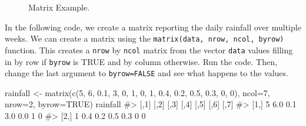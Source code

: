 \documentclass[
  letterpaper,
]{latex/krantz}
\makeatletter
\newenvironment{Shaded}{\begin{snugshade}}{\end{snugshade}}
\newcommand{\AttributeTok}[1]{\textcolor[rgb]{0.40,0.45,0.13}{#1}}
\newcommand{\CommentTok}[1]{\textcolor[rgb]{0.37,0.37,0.37}{#1}}
\newcommand{\ConstantTok}[1]{\textcolor[rgb]{0.56,0.35,0.01}{#1}}
\newcommand{\DecValTok}[1]{\textcolor[rgb]{0.68,0.00,0.00}{#1}}
\newcommand{\FloatTok}[1]{\textcolor[rgb]{0.68,0.00,0.00}{#1}}
\newcommand{\FunctionTok}[1]{\textcolor[rgb]{0.28,0.35,0.67}{#1}}
\newcommand{\NormalTok}[1]{\textcolor[rgb]{0.00,0.23,0.31}{#1}}
\newcommand{\OtherTok}[1]{\textcolor[rgb]{0.00,0.23,0.31}{#1}}
\newenvironment{kframe}{%
\medskip{}
\setlength{\fboxsep}{.8em}
 \def\at@end@of@kframe{}%
 \ifinner\ifhmode%
  \def\at@end@of@kframe{\end{minipage}}%
  \begin{minipage}{\columnwidth}%
 \fi\fi%
 \def\FrameCommand##1{\hskip\@totalleftmargin \hskip-\fboxsep
 \colorbox{shadecolor}{##1}\hskip-\fboxsep
     \hskip-\linewidth \hskip-\@totalleftmargin \hskip\columnwidth}%
 \MakeFramed {\advance\hsize-\width
   \@totalleftmargin\z@ \linewidth\hsize
   \@setminipage}}%
 {\par\unskip\endMakeFramed%
 \at@end@of@kframe}
\renewenvironment{Shaded}{\begin{kframe}}{\end{kframe}}
\makeatother
\begin{document}
\begin{figure}


\caption{\label{fig-matrix}Matrix Example.}

\end{figure}%

In the following code, we create a matrix reporting the daily rainfall
over multiple weeks. We can create a matrix using the
\texttt{matrix(data,\ nrow,\ ncol,\ byrow)}
function. This creates a \texttt{nrow} by \texttt{ncol} matrix from the
vector \texttt{data} values filling in by row if \texttt{byrow} is TRUE
and by column otherwise. Run the code. Then, change the last argument to
\texttt{byrow=FALSE} and see what happens to the values.

\begin{Shaded}
\begin{Highlighting}[]
\NormalTok{rainfall }\OtherTok{\textless{}{-}} \FunctionTok{matrix}\NormalTok{(}\FunctionTok{c}\NormalTok{(}\DecValTok{5}\NormalTok{, }\DecValTok{6}\NormalTok{, }\FloatTok{0.1}\NormalTok{, }\DecValTok{3}\NormalTok{, }\DecValTok{0}\NormalTok{, }\DecValTok{1}\NormalTok{, }\DecValTok{0}\NormalTok{, }\DecValTok{1}\NormalTok{, }\FloatTok{0.4}\NormalTok{, }\FloatTok{0.2}\NormalTok{, }
                     \FloatTok{0.5}\NormalTok{, }\FloatTok{0.3}\NormalTok{, }\DecValTok{0}\NormalTok{, }\DecValTok{0}\NormalTok{), }
                   \AttributeTok{ncol=}\DecValTok{7}\NormalTok{, }\AttributeTok{nrow=}\DecValTok{2}\NormalTok{, }\AttributeTok{byrow=}\ConstantTok{TRUE}\NormalTok{)}
\NormalTok{rainfall}
\CommentTok{\#\textgreater{}      [,1] [,2] [,3] [,4] [,5] [,6] [,7]}
\CommentTok{\#\textgreater{} [1,]    5  6.0  0.1  3.0  0.0    1    0}
\CommentTok{\#\textgreater{} [2,]    1  0.4  0.2  0.5  0.3    0    0}
\end{Highlighting}
\end{Shaded}
\end{document}
